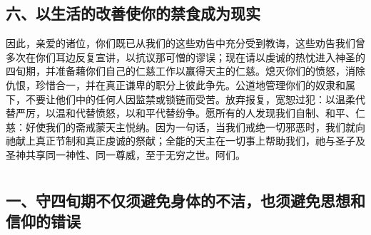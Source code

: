 
\subsection{六、以生活的改善使你的禁食成为现实}

因此，亲爱的诸位，你们既已从我们的这些劝告中充分受到教诲，这些劝告我们曾多次在你们耳边反复宣讲，以抗议那可憎的谬误；现在请以虔诚的热忱进入神圣的四旬期，并准备藉你们自己的仁慈工作以赢得天主的仁慈。熄灭你们的愤怒，消除仇恨，珍惜合一，并在真正谦卑的职分上彼此争先。公道地管理你们的奴隶和属下，不要让他们中的任何人因监禁或锁链而受苦。放弃报复，宽恕过犯：以温柔代替严厉，以温和代替愤怒，以和平代替纷争。愿所有的人发现我们自制、和平、仁慈：好使我们的斋戒蒙天主悦纳。因为一句话，当我们戒绝一切邪恶时，我们就向祂献上真正节制和真正虔诚的祭献；全能的天主在一切事上帮助我们，祂与圣子及圣神共享同一神性、同一尊威，至于无穷之世。阿们。\par



\section{}

\par


\subsection{一、守四旬期不仅须避免身体的不洁，也须避免思想和信仰的错误}


